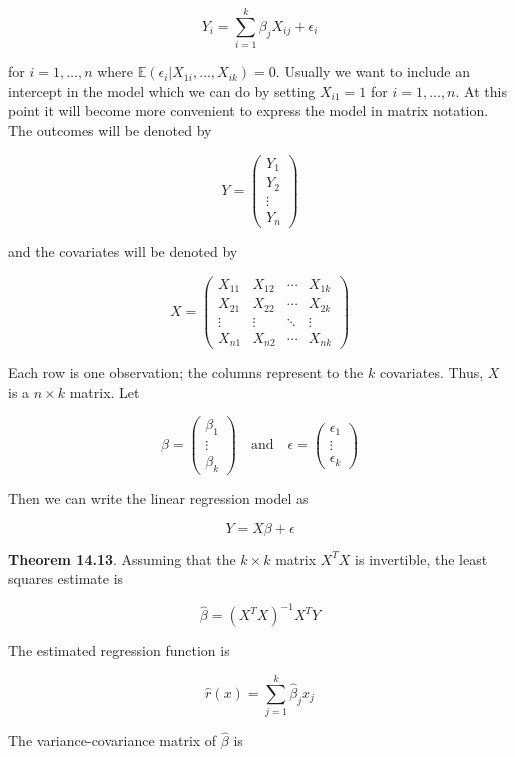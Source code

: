 \[ Y_i = \sum_{i=1}^k \beta_j X_{ij} + \epsilon_i \]

for \(i = 1, \dots, n\) where
\(\mathbb{E}(\epsilon_i | X_{1i}, \dots, X_{ik}) = 0\). Usually we want
to include an intercept in the model which we can do by setting
\(X_{i1} = 1\) for \(i = 1, \dots, n\). At this point it will become
more convenient to express the model in matrix notation. The outcomes
will be denoted by

\[ Y = \begin{pmatrix}
Y_1 \\
Y_2 \\
\vdots \\
Y_n
\end{pmatrix}
\]

and the covariates will be denoted by

\[ X = \begin{pmatrix}
X_{11} & X_{12} & \cdots & X_{1k} \\
X_{21} & X_{22} & \cdots & X_{2k} \\
\vdots & \vdots & \ddots & \vdots \\
X_{n1} & X_{n2} & \cdots & X_{nk}
\end{pmatrix}
\]

Each row is one observation; the columns represent to the \(k\)
covariates. Thus, \(X\) is a \(n \times k\) matrix. Let

\[
\beta = \begin{pmatrix}
\beta_1 \\
\vdots \\
\beta_k
\end{pmatrix}
\quad \text{and} \quad
\epsilon = \begin{pmatrix}
\epsilon_1 \\
\vdots \\
\epsilon_k
\end{pmatrix}
\]

Then we can write the linear regression model as

\[ Y = X \beta + \epsilon \]

\textbf{Theorem 14.13}. Assuming that the \(k \times k\) matrix \(X^TX\)
is invertible, the least squares estimate is

\[ \hat{\beta} = (X^T X)^{-1} X^T Y \]

The estimated regression function is

\[ \hat{r}(x) = \sum_{j=1}^k \hat{\beta}_j x_j\]

The variance-covariance matrix of \(\hat{\beta}\) is

